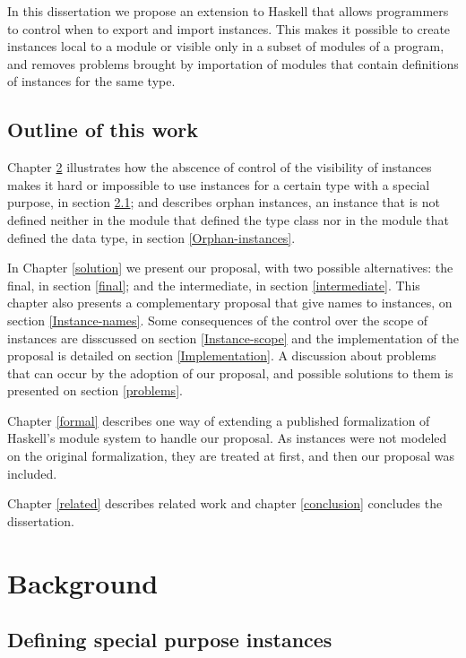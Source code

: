 \documentclass[msc]{ppgccufmg}
\begin{document}
In this dissertation we propose an extension to Haskell that
allows programmers to control when to export and import instances.
This makes it possible to create instances local to a module or
visible only in a subset of modules of a program, and removes problems
brought by importation of modules that contain definitions of
instances for the same type.

\section{Outline of this work}
Chapter \ref{Background} illustrates how the abscence of control of the visibility of instances makes it hard or impossible to use instances for a certain type with a special purpose, in section \ref{Special-purpose-instances}; and describes orphan instances, an instance that is not defined neither in the module that defined the type class nor in the module that defined the data type, in section \ref{Orphan-instances}.

In Chapter \ref{solution} we present our
proposal, with two possible alternatives: the final, in section \ref{final}; and the intermediate, in section \ref{intermediate}.
This chapter also presents a complementary proposal that give names to instances, on section \ref{Instance-names}.
Some consequences of the control over the scope of instances are disscussed on section \ref{Instance-scope} and the implementation of the proposal is detailed on section \ref{Implementation}.
A discussion about problems that can occur by the adoption of our proposal, and possible solutions to them is presented on section \ref{problems}.

Chapter \ref{formal} describes one way of extending a published
formalization of Haskell's module system \citep{formal} to handle our proposal.
As instances were not modeled on the original formalization, they are treated at first, and then our proposal was included.

Chapter \ref{related} describes related work and chapter \ref{conclusion} concludes the dissertation.

\chapter{Background}
\label{Background}

\section{Defining special purpose instances}
\label{Special-purpose-instances}
\end{document}
